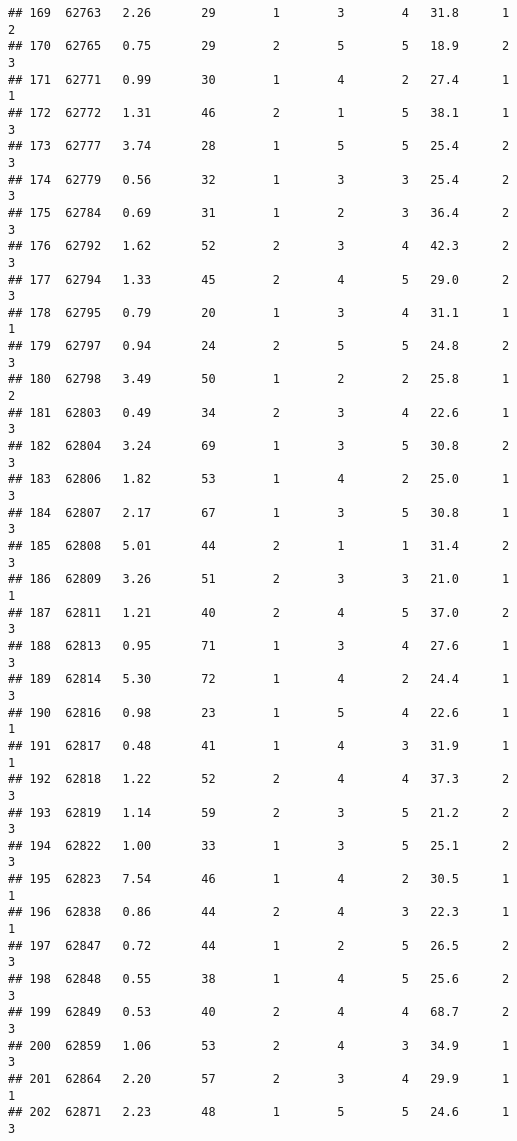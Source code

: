 \documentclass[
]{article}
\begin{document}
\begin{verbatim}
## 169  62763   2.26       29        1        3        4   31.8      1      2
## 170  62765   0.75       29        2        5        5   18.9      2      3
## 171  62771   0.99       30        1        4        2   27.4      1      1
## 172  62772   1.31       46        2        1        5   38.1      1      3
## 173  62777   3.74       28        1        5        5   25.4      2      3
## 174  62779   0.56       32        1        3        3   25.4      2      3
## 175  62784   0.69       31        1        2        3   36.4      2      3
## 176  62792   1.62       52        2        3        4   42.3      2      3
## 177  62794   1.33       45        2        4        5   29.0      2      3
## 178  62795   0.79       20        1        3        4   31.1      1      1
## 179  62797   0.94       24        2        5        5   24.8      2      3
## 180  62798   3.49       50        1        2        2   25.8      1      2
## 181  62803   0.49       34        2        3        4   22.6      1      3
## 182  62804   3.24       69        1        3        5   30.8      2      3
## 183  62806   1.82       53        1        4        2   25.0      1      3
## 184  62807   2.17       67        1        3        5   30.8      1      3
## 185  62808   5.01       44        2        1        1   31.4      2      3
## 186  62809   3.26       51        2        3        3   21.0      1      1
## 187  62811   1.21       40        2        4        5   37.0      2      3
## 188  62813   0.95       71        1        3        4   27.6      1      3
## 189  62814   5.30       72        1        4        2   24.4      1      3
## 190  62816   0.98       23        1        5        4   22.6      1      1
## 191  62817   0.48       41        1        4        3   31.9      1      1
## 192  62818   1.22       52        2        4        4   37.3      2      3
## 193  62819   1.14       59        2        3        5   21.2      2      3
## 194  62822   1.00       33        1        3        5   25.1      2      3
## 195  62823   7.54       46        1        4        2   30.5      1      1
## 196  62838   0.86       44        2        4        3   22.3      1      1
## 197  62847   0.72       44        1        2        5   26.5      2      3
## 198  62848   0.55       38        1        4        5   25.6      2      3
## 199  62849   0.53       40        2        4        4   68.7      2      3
## 200  62859   1.06       53        2        4        3   34.9      1      3
## 201  62864   2.20       57        2        3        4   29.9      1      1
## 202  62871   2.23       48        1        5        5   24.6      1      3

\end{verbatim}
\end{document}
